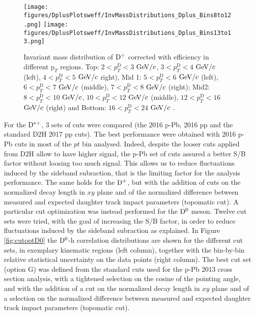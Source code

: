 \begin{figure}[h]
\centering
{\texttt{[image: figures/DplusPlotsweff/InvMassDistributions\_Dplus\_Bins8to12.png]}}
{\texttt{[image: figures/DplusPlotsweff/InvMassDistributions\_Dplus\_Bins13to13.png]}}
\caption{Invariant mass distribution of ${\rm D^+}$ corrected with efficiency in different $\text{p}_T$ regions. Top: $2< p_{T}^{\text{D}}< 3$ $\mathrm{GeV}/c$, $3< p_{T}^{\text{D}}< 4$ $\mathrm{GeV}/c$ (left), $4< p_{T}^{\text{D}}< 5$ $\mathrm{GeV}/c$ right), Mid 1: $5< p_{T}^{\text{D}}< 6$ $\mathrm{GeV}/c$ (left), $6 < p_{T}^{\text{D}} < 7$ $\mathrm{GeV}/c$ (middle), $7< p_{T}^{\text{D}}< 8$ $\mathrm{GeV}/c$ (right); Mid2: $8< p_{T}^{\text{D}}< 10$ $\mathrm{GeV}/c$, $10< p_{T}^{\text{D}}< 12$ $\mathrm{GeV}/c$  (middle), $12 < p_{T}^{\text{D}}< 16$ $\mathrm{GeV}/c$  (right) and Bottom: $16<p_{T}^{\text{D}}< 24$ $\mathrm{GeV}/c$ .}
\label{fig:InvMassDp}
\end{figure}

For the ${\rm D^{*+}}$, 3 sets of cuts were compared (the 2016 p-Pb, 2016 pp and the standard D2H 2017 pp cuts). The best performance were obtained with 2016 p-Pb cuts in most of the $pt$ bin analysed. Indeed, despite the looser cuts applied from D2H allow to have higher signal, the p-Pb set of cuts assured a better S/B factor without loosing too much signal. This allows us to reduce fluctuations induced by the sideband subraction, that is the limiting factor for the analysis performance.
The same holds for the ${\rm D^+}$, but with the addition of cuts on the normalized decay length in $xy$ plane and of the normalized difference between measured and expected daughter track impact parameters (topomatic cut).
A particular cut optimization was instead performed for the ${\rm D^0}$ meson. Twelve cut sets were tried, with the goal of increasing the S/B factor, in order to reduce fluctuations induced by the sideband subraction as explained.
In Figure \ref{fig:cutoptD0} the ${\rm D^0}$-h correlation distributions are shown for the different cut sets, in exemplary kinematic regions (left column), together with the bin-by-bin relative statistical uncertainty on the data points (right column). The best cut set (option G) was defined from the standard cuts used for the p-Pb 2013 cross section analysis, with a tightened selection on the cosine of the pointing angle, and with the addition of a cut on the normalized decay length in $xy$ plane and of a selection on the normalized difference between measured and expected daughter track impact parameters (topomatic cut).

